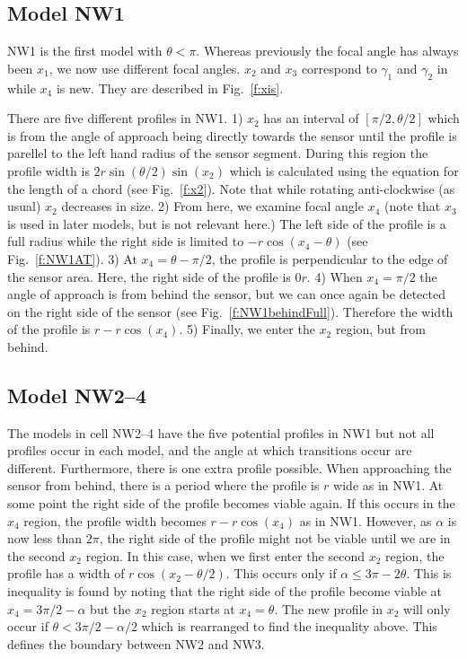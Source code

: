 \subsection{Model NW1} \label{NW1}

NW1 is the first model with $\theta < \pi$. Whereas previously the focal angle has always been $x_1$, we now use different focal angles. $x_2$ and $x_3$ correspond to $\gamma_1$ and $\gamma_2$ in \cite{rowcliffe2008estimating} while $x_4$ is new. They are described in Fig.~\ref{f:xis}. 

There are five different profiles in NW1. 1) $x_2$ has an interval of $[\pi/2, \theta/2]$ which is from the angle of approach being directly towards the sensor until the profile is parellel to the left hand radius of the sensor segment. During this region the profile width is $2r\sin\left(\theta/2\right)\sin(x_2)$ which is calculated using the equation for the length of a chord (see Fig.~\ref{f:x2}). Note that while rotating anti-clockwise (as usual) $x_2$ decreases in size. 2) From here, we examine focal angle $x_4$ (note that $x_3$ is used in later models, but is not relevant here.)  The left side of the profile is a full radius while the right side is limited to $- r\cos(x_4 - \theta)$ (see Fig.~\ref{f:NW1AT}). 3) At $x_4 =  \theta - \pi/2$, the profile is perpendicular to the edge of the sensor area. Here, the right side of the profile is $0r$. 4) When $x_4 = \pi/2$ the angle of approach is from behind the sensor, but we can once again be detected on the right side of the sensor (see Fig.~\ref{f:NW1behindFull}). Therefore the width of the profile is $r - r\cos(x_4)$. 5) Finally, we enter the $x_2$ region, but from behind. 



\subsection{Model NW2--4} \label{NW2--4}

The models in cell NW2--4 have the five potential profiles in NW1 but not all profiles occur in each model, and the angle at which transitions occur are different. Furthermore, there is one extra profile possible. When approaching the sensor from behind, there is a period where the profile is $r$ wide as in NW1. At some point the right side of the profile becomes viable again. If this occurs in the $x_4$ region, the profile width becomes  $r - r\cos(x_4)$ as in NW1. However, as $\alpha$ is now less than $2\pi$, the right side of the profile might not be viable until we are in the second $x_2$ region. In this case, when we first enter the second $x_2$ region, the profile has a width of $r\cos(x_2 - \theta/2)$. This occurs only if $\alpha \le 3\pi - 2\theta$. This is inequality is found by noting that the right side of the profile become viable at $x_4 = 3\pi/2 - \alpha$ but the $x_2$ region starts at $x_4 = \theta$. The new profile in $x_2$ will only occur if  $ \theta < 3\pi/2 - \alpha/2$ which is rearranged to find the inequality above. This defines the boundary between NW2 and NW3.

